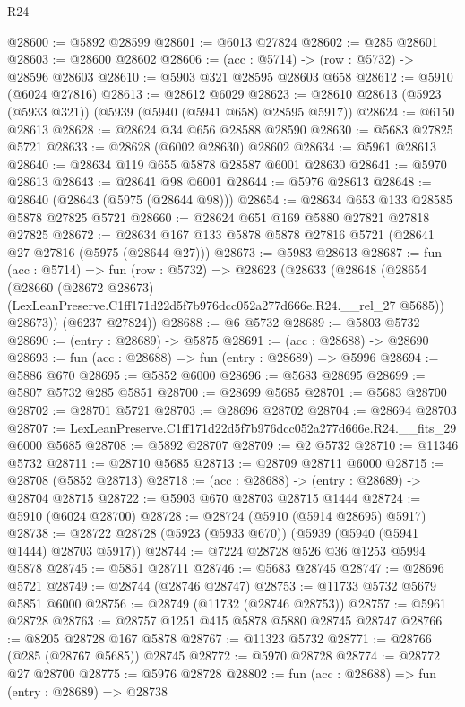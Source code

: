 \begin{lexlean}{R24}
\begin{coremodule}
@28600 := @5892 @28599
@28601 := @6013 @27824
@28602 := @285 @28601
@28603 := @28600 @28602
@28606 := (acc : @5714) -> (row : @5732) -> @28596 @28603
@28610 := @5903 @321 @28595 @28603 @658
@28612 := @5910 (@6024 @27816)
@28613 := @28612 @6029
@28623 := @28610 @28613 (@5923 (@5933 @321)) (@5939 (@5940 (@5941 @658) @28595 @5917))
@28624 := @6150 @28613
@28628 := @28624 @34 @656 @28588 @28590
@28630 := @5683 @27825 @5721
@28633 := @28628 (@6002 @28630) @28602
@28634 := @5961 @28613
@28640 := @28634 @119 @655 @5878 @28587 @6001 @28630
@28641 := @5970 @28613
@28643 := @28641 @98 @6001
@28644 := @5976 @28613
@28648 := @28640 (@28643 (@5975 (@28644 @98)))
@28654 := @28634 @653 @133 @28585 @5878 @27825 @5721
@28660 := @28624 @651 @169 @5880 @27821 @27818 @27825
@28672 := @28634 @167 @133 @5878 @5878 @27816 @5721 (@28641 @27 @27816 (@5975 (@28644 @27)))
@28673 := @5983 @28613
@28687 := fun (acc : @5714) =>
  fun (row : @5732) =>
  @28623
    (@28633
      (@28648
        (@28654
          (@28660
            (@28672 @28673)
            (LexLeanPreserve.C1ff171d22d5f7b976dcc052a277d666e.R24.__rel_27 @5685))
          @28673))
      (@6237 @27824))
@28688 := @6 @5732
@28689 := @5803 @5732
@28690 := (entry : @28689) -> @5875
@28691 := (acc : @28688) -> @28690
@28693 := fun (acc : @28688) => fun (entry : @28689) => @5996
@28694 := @5886 @670
@28695 := @5852 @6000
@28696 := @5683 @28695
@28699 := @5807 @5732 @285 @5851
@28700 := @28699 @5685
@28701 := @5683 @28700
@28702 := @28701 @5721
@28703 := @28696 @28702
@28704 := @28694 @28703
@28707 := LexLeanPreserve.C1ff171d22d5f7b976dcc052a277d666e.R24.__fits_29 @6000 @5685
@28708 := @5892 @28707
@28709 := @2 @5732
@28710 := @11346 @5732
@28711 := @28710 @5685
@28713 := @28709 @28711 @6000
@28715 := @28708 (@5852 @28713)
@28718 := (acc : @28688) -> (entry : @28689) -> @28704 @28715
@28722 := @5903 @670 @28703 @28715 @1444
@28724 := @5910 (@6024 @28700)
@28728 := @28724 (@5910 (@5914 @28695) @5917)
@28738 := @28722 @28728 (@5923 (@5933 @670)) (@5939 (@5940 (@5941 @1444) @28703 @5917))
@28744 := @7224 @28728 @526 @36 @1253 @5994 @5878
@28745 := @5851 @28711
@28746 := @5683 @28745
@28747 := @28696 @5721
@28749 := @28744 (@28746 @28747)
@28753 := @11733 @5732 @5679 @5851 @6000
@28756 := @28749 (@11732 (@28746 @28753))
@28757 := @5961 @28728
@28763 := @28757 @1251 @415 @5878 @5880 @28745 @28747
@28766 := @8205 @28728 @167 @5878
@28767 := @11323 @5732
@28771 := @28766 (@285 (@28767 @5685)) @28745
@28772 := @5970 @28728
@28774 := @28772 @27 @28700
@28775 := @5976 @28728
@28802 := fun (acc : @28688) =>
  fun (entry : @28689) =>
  @28738

\end{coremodule}
\end{lexlean}

